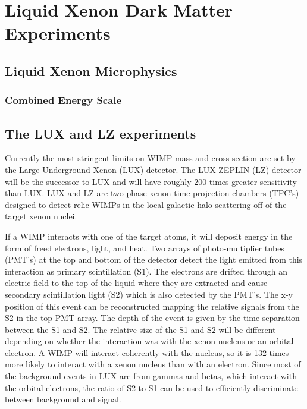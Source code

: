 \chapter{Liquid Xenon Dark Matter Experiments}

\section{Liquid Xenon Microphysics}
\subsection{Combined Energy Scale}




\section{The LUX and LZ experiments}
Currently the most stringent limits on WIMP mass and cross section are set by the Large Underground Xenon (LUX) detector. The LUX-ZEPLIN (LZ) detector will be the successor to LUX and will have roughly 200 times greater sensitivity than LUX. LUX and LZ are two-phase xenon time-projection chambers (TPC's) designed to detect relic WIMPs in the local galactic halo scattering off of the target xenon nuclei. 

If a WIMP interacts with one of the target atoms, it will deposit energy in the form of freed electrons, light, and heat. Two arrays of photo-multiplier tubes (PMT's) at the top and bottom of the detector detect the light emitted from this interaction as primary scintillation (S1). The electrons are drifted through an electric field to the top of the liquid where they are extracted and cause secondary scintillation light (S2) which is also detected by the PMT's. The x-y position of this event can be reconstructed mapping the relative signals from the S2 in the top PMT array. The depth of the event is given by the time separation between the S1 and S2. The relative size of the S1 and S2 will be different depending on whether the interaction was with the xenon nucleus or an orbital electron. A WIMP will interact coherently with the nucleus, so it is 132 times more likely to interact with a xenon nucleus than with an electron. Since most of the background events in LUX are from gammas and betas, which interact with the orbital electrons, the ratio of S2 to S1 can be used to efficiently discriminate between background and signal.

